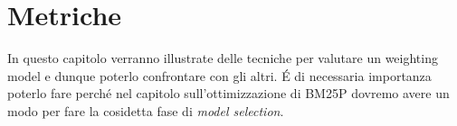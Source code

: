 \chapter{Metriche}

In questo capitolo verranno illustrate delle tecniche per valutare un weighting model e dunque poterlo confrontare con gli altri.
\'E di necessaria importanza poterlo fare perché nel capitolo sull'ottimizzazione di BM25P dovremo avere un modo per fare
la cosidetta fase di \textit{model selection}.

